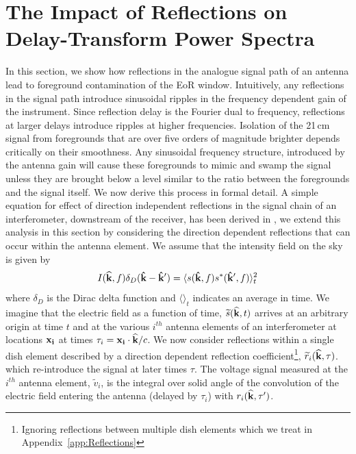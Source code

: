 \documentclass[twocolumn]{emulateapj}
\begin{document}
\section{The Impact of Reflections on Delay-Transform Power Spectra}\label{sec:Formalism}
In this section, we show how reflections in the analogue signal path of an antenna lead to foreground contamination of the EoR window. Intuitively, any reflections in the signal path introduce sinusoidal ripples in the frequency dependent gain of the instrument. Since reflection delay is the Fourier dual to frequency, reflections at larger delays introduce ripples at higher frequencies. Isolation of the 21\,cm signal from foregrounds that are over five orders of magnitude brighter depends critically on their smoothness. Any sinusoidal frequency structure, introduced by the antenna gain will cause these foregrounds to mimic and swamp the signal unless they are brought below a level similar to the ratio between the foregrounds and the signal itself. We now derive this process in formal detail. A simple equation for effect of direction independent reflections in the signal chain of an interferometer, downstream of the receiver, has been derived in \citet{EwallWice:2015a}, we extend this analysis in this section by considering the direction dependent reflections that can occur within the antenna element. We assume that the intensity field on the sky is given by 
\begin{equation}\label{eq:Dirac}
I({\bf \widehat{k}},f) \delta_D({\bf \hat{k}} - {\bf \hat{k}'})= \langle s({\bf \hat{k}},f)s^*({\bf \hat{k}'},f)  \rangle_t^2
\end{equation}
 where $\delta_D$ is the Dirac delta function and $\langle \rangle_t$ indicates an average in time. We imagine that the electric field as a function of time, $\widetilde{s}({\bf \widehat{k}},t)$ arrives at an arbitrary origin at time $t$ and at the various $i^{th}$ antenna elements of an interferometer at locations ${\bf x_i}$ at times $\tau_i={\bf x_i} \cdot {\bf \widehat{k}} /c$. We now consider reflections within a single dish element described by a direction dependent reflection coefficient\footnote{Ignoring reflections between multiple dish elements which we treat in Appendix~\ref{app:Reflections}}, $\widetilde{r}_i({\bf \widehat{k}},\tau)$. which re-introduce the signal at later times $\tau$. The voltage signal measured at the $i^{th}$ antenna element, $\widetilde{v}_i$, is the integral over solid angle of the convolution of the electric field entering the antenna (delayed by $\tau_i$) with $r_i({\bf \widehat{k}},\tau')$.
\end{document}
